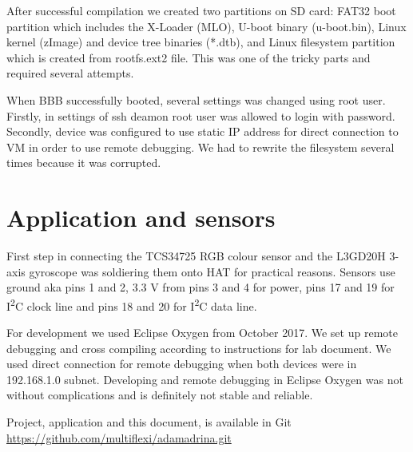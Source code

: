 \documentclass[UKenglish,10pt,a4paper]{report}
\let\openright=\clearpage
\begin{document}
After successful compilation we created two partitions on SD card: FAT32 boot partition which includes the X-Loader (MLO), U-boot binary (u-boot.bin), Linux kernel (zImage) and device tree binaries (*.dtb), and Linux filesystem partition which is created from rootfs.ext2 file. This was one of the tricky parts and required several attempts.

When BBB successfully booted, several settings was changed using root user. Firstly, in settings of ssh deamon root user was allowed to login with password. Secondly, device was configured to use static IP address for direct connection to VM in order to use remote debugging. We had to rewrite the filesystem several times because it was corrupted.

\chapter{Application and sensors}
First step in connecting the TCS34725 RGB colour sensor and the  L3GD20H 3-axis gyroscope was soldiering them onto HAT for practical reasons. Sensors use ground aka pins 1 and 2, 3.3 V from pins 3 and 4 for power, pins 17 and 19 for I\textsuperscript{2}C clock line and pins 18 and 20 for I\textsuperscript{2}C data line.

For development we used Eclipse Oxygen from October 2017. We set up remote debugging and cross compiling according to instructions for lab document. We used direct connection for remote debugging when both devices were in 192.168.1.0 subnet. Developing and remote debugging in Eclipse Oxygen was not without complications and is definitely not stable and reliable.

Project, application and this document, is available in Git \url{https://github.com/multiflexi/adamadrina.git}

\renewcommand{\acronymname}{List of acronyms}
\printglossaries



% 
\printbibliography
\openright
\end{document}
